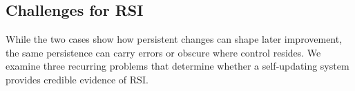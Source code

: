









\subsection{Challenges for RSI}

While the two cases show how persistent changes can shape later improvement, the same persistence can carry errors or obscure where control resides. We examine three recurring problems that determine whether a self-updating system provides credible evidence of RSI. %

